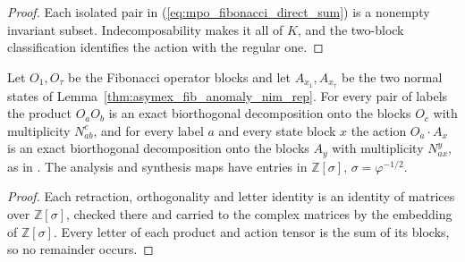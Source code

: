 \begin{proof}
    \leanok
    Each isolated pair in (\ref{eq:mpo_fibonacci_direct_sum}) is a nonempty
    invariant subset. Indecomposability makes it all of $K$, and the
    two-block classification identifies the action with the regular one.
\end{proof}

\begin{lemma}%
    \label{lem:mpo_symmetry_fibonacci_exact_trees}
    \leanok
    Let $O_1,O_\tau$ be the Fibonacci operator blocks and let
    $A_{x_1},A_{x_\tau}$ be the two normal states of
    Lemma~\ref{thm:asymex_fib_anomaly_nim_rep}. For every pair of labels
    the product $O_aO_b$ is an exact biorthogonal decomposition onto the
    blocks $O_c$ with multiplicity $N_{ab}^c$, and for every label $a$ and
    every state block $x$ the action $O_a\cdot A_x$ is an exact biorthogonal
    decomposition onto the blocks $A_y$ with multiplicity $N_{ax}^y$, as in
    \cite[Section~3]{GarreRubio2023MPOSym}. The analysis and synthesis maps
    have entries in $\mathbb{Z}[\sigma]$, $\sigma=\varphi^{-1/2}$.
\end{lemma}

\begin{proof}
    \leanok
    Each retraction, orthogonality and letter identity is an identity of
    matrices over $\mathbb{Z}[\sigma]$, checked there and carried to the
    complex matrices by the embedding of $\mathbb{Z}[\sigma]$. Every letter
    of each product and action tensor is the sum of its blocks, so no
    remainder occurs.
\end{proof}

